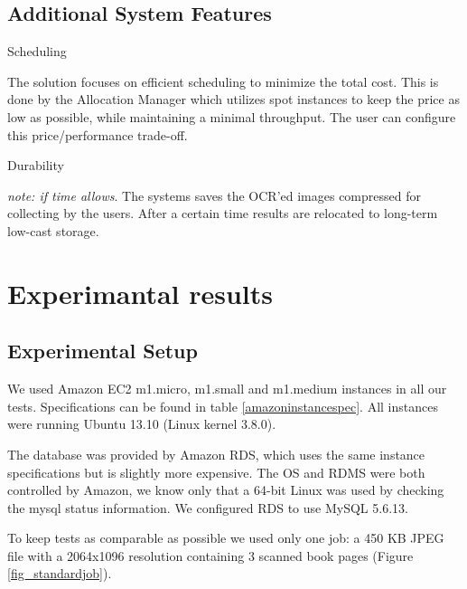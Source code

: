 \documentclass[a4paper]{IEEEtran}
\begin{document}
\subsection*{Additional System Features}

\begin{LaTeXdescription}

\item[Scheduling]

The solution focuses on efficient scheduling to minimize the total cost. This is done by the Allocation Manager which utilizes spot instances to keep the price as low as possible, while maintaining a minimal throughput. The user can configure this price/performance trade-off.

\item[Durability]

\emph{note: if time allows}. The systems saves the OCR'ed images compressed for collecting by the users. After a certain time results are relocated to long-term low-cast storage.

\end{LaTeXdescription}

\section{Experimantal results}

\subsection{Experimental Setup}

We used Amazon EC2 m1.micro, m1.small and m1.medium instances in all our tests. Specifications can be found in table \ref{amazoninstancespec}. All instances were running Ubuntu 13.10 (Linux kernel 3.8.0).

The database was provided by Amazon RDS, which uses the same instance specifications but is slightly more expensive. The OS and RDMS were both controlled by Amazon, we know only that a 64-bit Linux was used by checking the mysql status information. We configured RDS to use MySQL 5.6.13.

To keep tests as comparable as possible we used only one job: a 450 KB JPEG file with a 2064x1096 resolution containing 3 scanned book pages (Figure \ref{fig_standardjob}).
\end{document}
